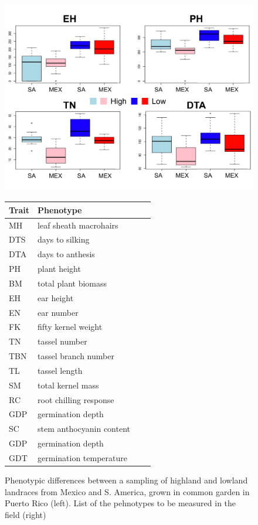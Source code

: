 \begin{figure}[ht!]
	\begin{minipage}{0.5\textwidth}
    		\centering
   		\includegraphics[width=\textwidth]{fourtraits.pdf}
  	\end{minipage}%
  	\begin{minipage}[c]{0.50\textwidth}
  		\centering
		\begin{tabular}{llcc}\\\toprule  
		{\bf Trait} & {\bf Phenotype}  \\\midrule
		MH & leaf sheath macrohairs  \\
		DTS & days to silking  \\
		DTA & days to anthesis  \\
		PH & plant height 			\\
		BM & total plant biomass 	\\
		EH & ear height			 \\
		EN & ear number			 \\
		FK & fifty kernel weight \\
		TN & tassel number \\
		TBN & tassel branch number \\
		TL & tassel length \\
		SM & total kernel mass \\
		RC & root chilling response \\
		GDP & germination depth \\
		SC & stem anthocyanin content \\
		GDP & germination depth \\
		GDT & germination temperature \\\bottomrule
		\end{tabular}
	\end{minipage}
 	\caption{ Phenotypic differences between a sampling of highland and lowland landraces from Mexico and S. America, grown in common garden in Puerto Rico (left). List of the pehnotypes to be measured in the field (right) }%
	\label{fig:phenos}
\end{figure}

